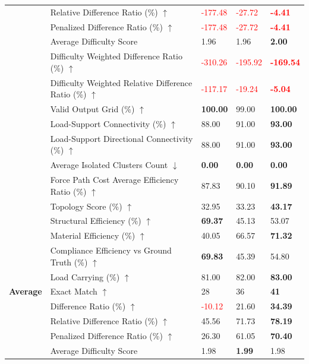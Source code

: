 \begin{table}[!h]
{\begin{tabular}{lllll}
 & Relative Difference Ratio (\%) $\uparrow$ & \textcolor{red}{-177.48} & \textcolor{red}{-27.72} & \textbf{\textcolor{red}{-4.41}} \\
 & Penalized Difference Ratio (\%) $\uparrow$ & \textcolor{red}{-177.48} & \textcolor{red}{-27.72} & \textbf{\textcolor{red}{-4.41}} \\
 & Average Difficulty Score & 1.96 & 1.96 & \textbf{2.00} \\
 & Difficulty Weighted Difference Ratio (\%) $\uparrow$ & \textcolor{red}{-310.26} & \textcolor{red}{-195.92} & \textbf{\textcolor{red}{-169.54}} \\
 & Difficulty Weighted Relative Difference Ratio (\%) $\uparrow$ & \textcolor{red}{-117.17} & \textcolor{red}{-19.24} & \textbf{\textcolor{red}{-5.04}} \\
 & Valid Output Grid (\%) $\uparrow$ & \textbf{100.00} & 99.00 & \textbf{100.00} \\
 & Load-Support Connectivity (\%) $\uparrow$ & 88.00 & 91.00 & \textbf{93.00} \\
 & Load-Support Directional Connectivity (\%) $\uparrow$ & 88.00 & 91.00 & \textbf{93.00} \\
 & Average Isolated Clusters Count $\downarrow$ & \textbf{0.00} & \textbf{0.00} & \textbf{0.00} \\
 & Force Path Cost Average Efficiency Ratio (\%) $\uparrow$ & 87.83 & 90.10 & \textbf{91.89} \\
 & Topology Score (\%) $\uparrow$ & 32.95 & 33.23 & \textbf{43.17} \\
 & Structural Efficiency (\%) $\uparrow$ & \textbf{69.37} & 45.13 & 53.07 \\
 & Material Efficiency (\%) $\uparrow$ & 40.05 & 66.57 & \textbf{71.32} \\
 & Compliance Efficiency vs Ground Truth (\%) $\uparrow$ & \textbf{69.83} & 45.39 & 54.80 \\
 & Load Carrying (\%) $\uparrow$ & 81.00 & 82.00 & \textbf{83.00} \\
\midrule
\textbf{Average} & Exact Match $\uparrow$ & 28 & 36 & \textbf{41} \\
 & Difference Ratio (\%) $\uparrow$ & \textcolor{red}{-10.12} & 21.60 & \textbf{34.39} \\
 & Relative Difference Ratio (\%) $\uparrow$ & 45.56 & 71.73 & \textbf{78.19} \\
 & Penalized Difference Ratio (\%) $\uparrow$ & 26.30 & 61.05 & \textbf{70.40} \\
 & Average Difficulty Score & 1.98 & \textbf{1.99} & 1.98 \\

\end{tabular}}
\end{table}
